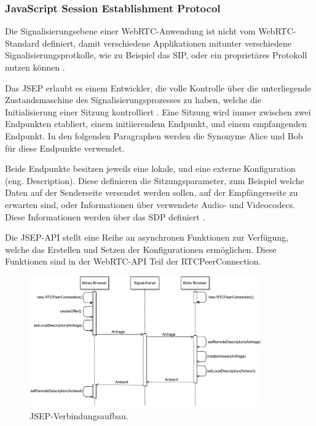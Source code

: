 \subsubsection{JavaScript Session Establishment Protocol}
Die Signalisierungsebene einer \acs{WebRTC}-Anwendung ist nicht vom \acs{WebRTC}-Standard definiert, damit verschiedene Applikationen mitunter verschiedene Signalisierungsprotkolle, wie zu Beispiel das \acf{SIP}, oder ein proprietäres Protokoll nutzen können \cite{loreto2014}.\par

Das \acf{JSEP} erlaubt es einem Entwickler, die volle Kontrolle über die unterliegende Zustandsmaschine des Signalisierungsprozesses zu haben, welche die Initialisierung einer Sitzung kontrolliert \cite{loreto2014}. Eine Sitzung wird immer zwischen zwei Endpunkten etabliert, einem initiierendem Endpunkt, und einem empfangenden Endpunkt. In den folgenden Paragraphen werden die Synonyme \glqq{}Alice\grqq{} und \glqq{}Bob\grqq{} für diese Endpunkte verwendet.\par

Beide Endpunkte besitzen jeweils eine lokale, und eine externe Konfiguration (eng. \glqq{}Description\grqq{}). Diese definieren die Sitzungsparameter, zum Beispiel welche Daten auf der Senderseite versendet werden sollen, auf der Empfängerseite zu erwarten sind, oder Informationen über verwendete Audio- und Videocodecs. Diese Informationen werden über das \acf{SDP} definiert \cite{altanai2014}.\par

Die \acs{JSEP}-\acs{API} stellt eine Reihe an asynchronen Funktionen zur Verfügung, welche das Erstellen und Setzen der Konfigurationen ermöglichen. Diese Funktionen sind in der \acs{WebRTC}-\acs{API} Teil der RTCPeerConnection.\par

\begin{figure}[h]
\centering
\includegraphics[width=0.89\textwidth]{bilder/PDF_SVG/JSEP.pdf}
\caption{\acs{JSEP}-Verbindungsaufbau.}
\label{fig:jsep}
\end{figure}

